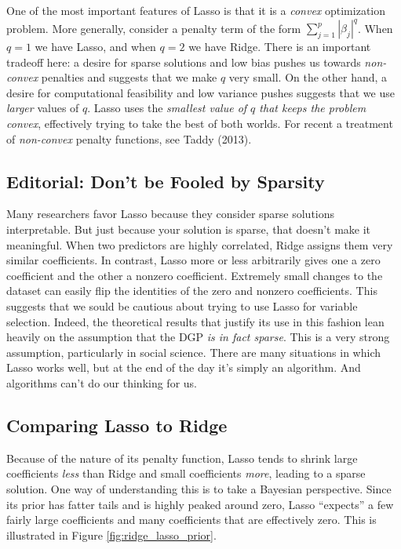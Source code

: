 \documentclass[12pt]{article}
\theoremstyle{definition}
\begin{document}
One of the most important features of Lasso is that it is a \emph{convex} optimization problem. More generally, consider a penalty term of the form $\sum_{j=1}^p |\beta_j|^q$. When $q=1$ we have Lasso, and when $q = 2$ we have Ridge.  There is an important tradeoff here: a desire for sparse solutions and low bias pushes us towards \emph{non-convex} penalties and suggests that we make $q$ very small. On the other hand, a desire for computational feasibility and low variance pushes suggests that we use \emph{larger} values of $q$. Lasso uses the \emph{smallest value of $q$ that keeps the problem convex}, effectively trying to take the best of both worlds. For recent a treatment of \emph{non-convex} penalty functions, see Taddy (2013).

\subsection{Editorial: Don't be Fooled by Sparsity}
Many researchers favor Lasso because they consider sparse solutions interpretable. But just because your solution is sparse, that doesn't make it meaningful. When two predictors are highly correlated, Ridge assigns them very similar coefficients. In contrast, Lasso more or less arbitrarily gives one a zero coefficient and the other a nonzero coefficient. Extremely small changes to the dataset can easily flip the identities of the zero and nonzero coefficients. This suggests that we sould be cautious about trying to use Lasso for variable selection. Indeed, the theoretical results that justify its use in this fashion lean heavily on the assumption that the DGP \emph{is in fact sparse}. This is a very strong assumption, particularly in social science. There are many situations in which Lasso works well, but at the end of the day it's simply an algorithm. And algorithms can't do our thinking for us.


\subsection{Comparing Lasso to Ridge}
Because of the nature of its penalty function, Lasso tends to shrink large coefficients \emph{less} than Ridge and small coefficients \emph{more}, leading to a sparse solution. One way of understanding this is to take a Bayesian perspective. Since its prior has fatter tails and is highly peaked around zero, Lasso ``expects'' a few fairly large coefficients and many coefficients that are effectively zero. This is illustrated in Figure \ref{fig:ridge_lasso_prior}.
\end{document}
